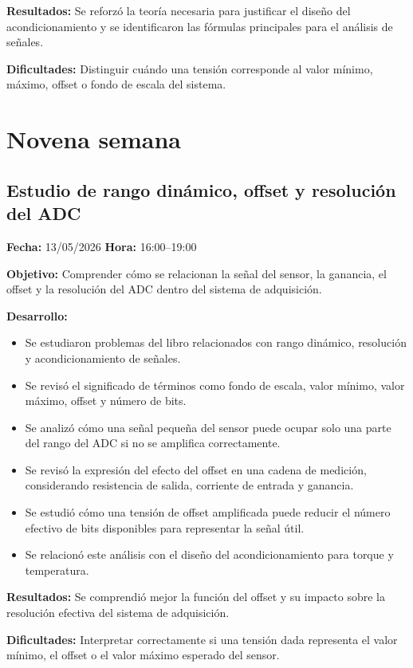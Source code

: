 \documentclass[12pt]{article}
\begin{document}
\textbf{Resultados:}
Se reforzó la teoría necesaria para justificar el diseño del acondicionamiento y se identificaron las fórmulas principales para el análisis de señales.

\textbf{Dificultades:}
Distinguir cuándo una tensión corresponde al valor mínimo, máximo, offset o fondo de escala del sistema.

\section{Novena semana}

\subsection{Estudio de rango dinámico, offset y resolución del ADC}
\textbf{Fecha:} 13/05/2026 \quad \textbf{Hora:} 16:00--19:00

\textbf{Objetivo:}
Comprender cómo se relacionan la señal del sensor, la ganancia, el offset y la resolución del ADC dentro del sistema de adquisición.

\textbf{Desarrollo:}
\begin{itemize}
\item Se estudiaron problemas del libro relacionados con rango dinámico, resolución y acondicionamiento de señales.
\item Se revisó el significado de términos como fondo de escala, valor mínimo, valor máximo, offset y número de bits.
\item Se analizó cómo una señal pequeña del sensor puede ocupar solo una parte del rango del ADC si no se amplifica correctamente.
\item Se revisó la expresión del efecto del offset en una cadena de medición, considerando resistencia de salida, corriente de entrada y ganancia.
\item Se estudió cómo una tensión de offset amplificada puede reducir el número efectivo de bits disponibles para representar la señal útil.
\item Se relacionó este análisis con el diseño del acondicionamiento para torque y temperatura.
\end{itemize}

\textbf{Resultados:}
Se comprendió mejor la función del offset y su impacto sobre la resolución efectiva del sistema de adquisición.

\textbf{Dificultades:}
Interpretar correctamente si una tensión dada representa el valor mínimo, el offset o el valor máximo esperado del sensor.
\end{document}
